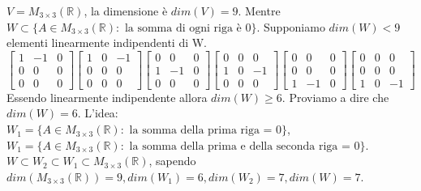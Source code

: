 \begin{example}
$V = M_{3\times3}(\mathbb{R})$, la dimensione è $dim(V) = 9$. Mentre $W \subset \{ A \in M_{3\times 3}(\mathbb{R}): \text{ la somma di ogni riga è 0}\}$. Supponiamo $dim(W) < 9$ elementi linearmente indipendenti di W.
\[
\begin{bmatrix}
1 & -1 & 0\\
0 & 0 & 0\\
0 & 0 & 0
\end{bmatrix}
\begin{bmatrix}
1 & 0 & -1\\
0 & 0 & 0\\
0 & 0 & 0
\end{bmatrix}
\begin{bmatrix}
0 & 0 & 0\\
1 & -1 & 0\\
0 & 0 & 0
\end{bmatrix}
\begin{bmatrix}
0 & 0 & 0\\
1 & 0 & -1\\
0 & 0 & 0
\end{bmatrix}
\begin{bmatrix}
0 & 0 & 0\\
0 & 0 & 0\\
1 & -1 & 0
\end{bmatrix}
\begin{bmatrix}
0 & 0 & 0\\
0 & 0 & 0\\
1 & 0 & -1
\end{bmatrix}
\]
Essendo linearmente indipendente allora $dim(W) \geq 6$. Proviamo a dire che $dim(W) = 6$. L'idea:\\
$W_1 = \{A \in M_{3 \times 3}(\mathbb{R}) : \text{ la somma della prima riga = 0}\}$,\\ $W_1 = \{A \in M_{3 \times 3}(\mathbb{R}) : \text{ la somma della prima e della seconda riga = 0}\}$.\\
$W \subset W_2 \subset W_1 \subset M_{3\times3}(\mathbb{R})$, sapendo $dim(M_{3\times3}(\mathbb{R})) = 9, dim(W_1) = 6, dim(W_2) = 7, dim(W) = 7$.
\end{example}

